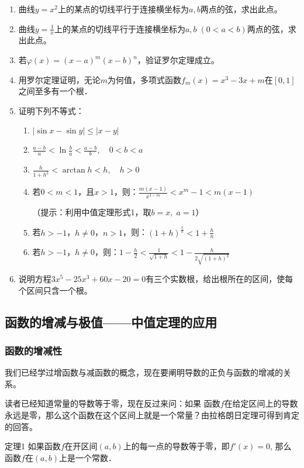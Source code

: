     
\begin{ex}
\begin{enumerate}
    \item 曲线$y=x^2$上的某点的切线平行于连接横坐标为$a,b$两点的弦，求出此点。
    \item 曲线$y=\frac{1}{x}$上的某点的切线平行于连接横坐标为$a,b\;(0<a<b)$两点的弦，求出此点。
    \item 若$\varphi(x)=(x-a)^m(x-b)^n$，验证罗尔定理成立。
    \item 用罗尔定理证明，无论$m$为何值，多项式函数$f_m(x)=x^3-3x+m$在$[0, 1]$之间至多有一个根．
    \item 证明下列不等式：
\begin{enumerate}
    \item $|\sin x-\sin y|\le |x-y|$
    \item $\frac{a-b}{a}<\ln \frac{b}{a}<\frac{a-b}{b},\quad 0<b<a$
    \item $\frac{h}{1+h^2}<\arctan h<h,\quad h>0$
    \item 若$0<m<1$，且$x>1$，则：$\frac{m(x-1)}{x^{1-m}}<x^m-1<m(x-1)$
    
    （提示：利用中值定理形式1，取$b=x,\; a=1$）
    \item 若$h>-1$，$h\ne 0$，$n>1$，则：$(1+h)^{\tfrac{1}{n}}<1+\frac{h}{n}$
    \item 若$h>-1$，$h\ne 0$，则：$1-\frac{h}{2}<\frac{1}{\sqrt{1+h}}<1-\frac{h}{2\sqrt{(1+h)^3}}$
\end{enumerate}
\item 说明方程$3x^5-25x^3+60x-20=0$有三个实数根，给出根所在的区间，使每个区间只含一个根。
\end{enumerate}
\end{ex}

\subsection{函数的增减与极值——中值定理的应用}

\subsubsection{函数的增减性}

我们已经学过增函数与减函数的概念，现在要阐明导数的正负与函数的增减的关系。

读者已经知道常量的导数等于零，现在反过来问：如果
函数$f$在给定区间上的导数永远是零，那么这个函数在这个区间上就是一个常量？由拉格朗日定理可得到肯定的回答。

\begin{blk}
  {定理1} 如果函数$f$在开区间$(a,b)$上的每一点的导数等于零，即$f'(x)=0$, 那么函数$f$在$(a,b)$上是一个常数．  
\end{blk}

